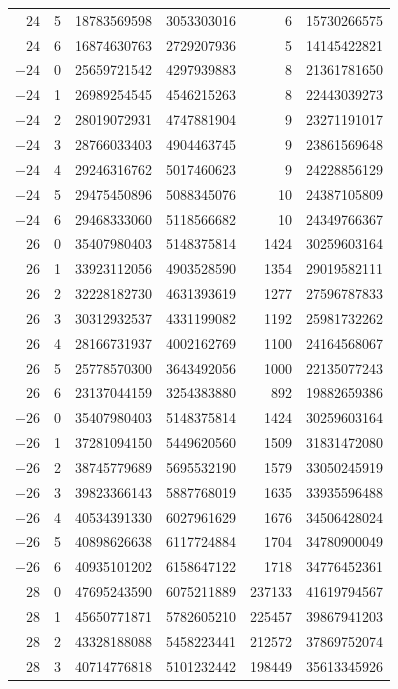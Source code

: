 {\begin{longtable}{rrrrrr}
$24$ & 5 & 18783569598 & 3053303016 & 6 & 15730266575\\
$24$ & 6 & 16874630763 & 2729207936 & 5 & 14145422821\\
$-24$ & 0 & 25659721542 & 4297939883 & 8 & 21361781650\\
$-24$ & 1 & 26989254545 & 4546215263 & 8 & 22443039273\\
$-24$ & 2 & 28019072931 & 4747881904 & 9 & 23271191017\\
$-24$ & 3 & 28766033403 & 4904463745 & 9 & 23861569648\\
$-24$ & 4 & 29246316762 & 5017460623 & 9 & 24228856129\\
$-24$ & 5 & 29475450896 & 5088345076 & 10 & 24387105809\\
$-24$ & 6 & 29468333060 & 5118566682 & 10 & 24349766367\\
$26$ & 0 & 35407980403 & 5148375814 & 1424 & 30259603164\\
$26$ & 1 & 33923112056 & 4903528590 & 1354 & 29019582111\\
$26$ & 2 & 32228182730 & 4631393619 & 1277 & 27596787833\\
$26$ & 3 & 30312932537 & 4331199082 & 1192 & 25981732262\\
$26$ & 4 & 28166731937 & 4002162769 & 1100 & 24164568067\\
$26$ & 5 & 25778570300 & 3643492056 & 1000 & 22135077243\\
$26$ & 6 & 23137044159 & 3254383880 & 892 & 19882659386\\
$-26$ & 0 & 35407980403 & 5148375814 & 1424 & 30259603164\\
$-26$ & 1 & 37281094150 & 5449620560 & 1509 & 31831472080\\
$-26$ & 2 & 38745779689 & 5695532190 & 1579 & 33050245919\\
$-26$ & 3 & 39823366143 & 5887768019 & 1635 & 33935596488\\
$-26$ & 4 & 40534391330 & 6027961629 & 1676 & 34506428024\\
$-26$ & 5 & 40898626638 & 6117724884 & 1704 & 34780900049\\
$-26$ & 6 & 40935101202 & 6158647122 & 1718 & 34776452361\\
$28$ & 0 & 47695243590 & 6075211889 & 237133 & 41619794567\\
$28$ & 1 & 45650771871 & 5782605210 & 225457 & 39867941203\\
$28$ & 2 & 43328188088 & 5458223441 & 212572 & 37869752074\\
$28$ & 3 & 40714776818 & 5101232442 & 198449 & 35613345926\\

\end{longtable}}

